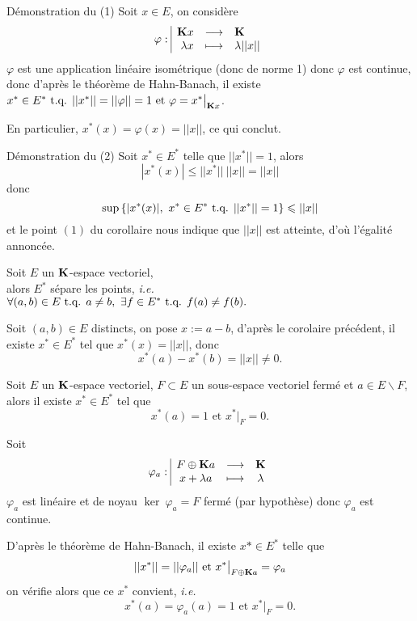 \documentclass[a4paper,11pt, twoside]{article}
\begin{document}
\begin{ProofC}{Démonstration du (1)}
  Soit $x\in  E$, on considère 
  $$\varphi:\begin{array}{|rcl}
    \mathbf K x&\longrightarrow&\mathbf K\\
    \lambda x&\longmapsto&\lambda||x||
  \end{array}$$
  $\varphi$ est une application linéaire isométrique (donc de norme 1) donc $\varphi$ est continue, donc d'après le théorème de Hahn-Banach, il existe $x^*\in E^*\text{ t.q. } ||x^*||=||\varphi||=1\text{ et }\varphi=x^*\big|_{\mathbf K x}$.

  En particulier, $x^*(x)=\varphi(x)=||x||$, ce qui conclut.
\end{ProofC}


\begin{ProofC}{Démonstration du (2)}
  Soit $x^*\in E^*$ telle que $||x^*||=1$, alors
  $$|x^*(x)|\leqslant ||x^*||\ ||x||=||x||$$
  donc 
  $$\mathrm{sup}\left\{|x^*(x)|,\ x^*\in E^*\text{ t.q. } ||x^*||=1\right\}\leqslant ||x||$$
  et le point $(1)$ du corollaire nous indique que $||x||$ est atteinte, d'où l'égalité annoncée.
\end{ProofC}


\begin{corollaire}
  Soit $E$ un $\mathbf K$-espace vectoriel,\\

  alors $E^*$ sépare les points, \emph{i.e.}\\
  $\forall (a,b)\in E\text{ t.q. } a\neq b,\ \exists f\in E^*\text{ t.q. } f(a)\neq f(b).$
\end{corollaire}


\begin{Proof}
  Soit $(a,b)\in E$ distincts, on pose $x:=a-b$, d'après le corolaire précédent, il existe $x^*\in E^*$ tel que $x^*(x)=||x||$, donc 
  $$x^*(a)-x^*(b)=||x||\neq0.$$
\end{Proof}


\begin{corollaire}
  Soit $E$ un $\mathbf K$-espace vectoriel, $F\subset E$ un sous-espace vectoriel fermé et $a\in E\backslash F$,\\

  alors il existe $x^*\in E^*$ tel que 
  $$x^*(a)=1\text{ et }x^*\big|_F=0.$$
\end{corollaire}


\begin{Proof}
  Soit 
  $$\varphi_a:\begin{array}{|ccc}
    F\oplus \mathbf K a&\longrightarrow&\mathbf K\\
    x+\lambda a&\longmapsto&\lambda
  \end{array}$$
  $\varphi_a$ est linéaire et de noyau $\ker\ \varphi_a=F$ fermé (par hypothèse) donc $\varphi_a$ est continue.

  D'après le théorème de Hahn-Banach, il existe $x*\in E^*$ telle que 
  $$||x^*||=||\varphi_a||\text{ et }x^*\big|_{F\oplus \mathbf K a}=\varphi_a$$
  on vérifie alors que ce $x^*$ convient, \emph{i.e.} 
  $$x^*(a)=\varphi_a(a)=1\text{ et }x^*\big|_F=0.$$
\end{Proof}
\end{document}
